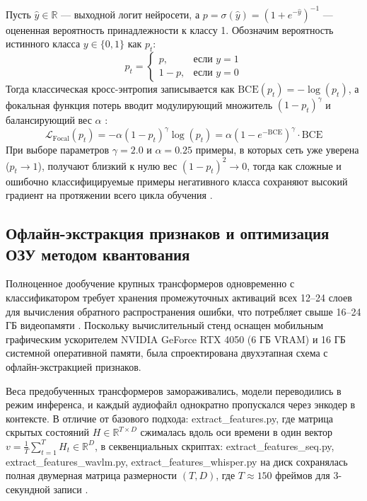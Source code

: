 \documentclass[a4paper,14pt]{extarticle}
\begin{document}
	Пусть $\hat{y} \in \mathbb{R}$ — выходной логит нейросети, а $p = \sigma(\hat{y}) = (1 + e^{-\hat{y}})^{-1}$ — оцененная вероятность принадлежности к классу 1. Обозначим вероятность истинного класса $y \in \{0, 1\}$ как $p_t$:
	\begin{equation}
		p_t = \begin{cases} p, & \text{если } y = 1 \\ 1 - p, & \text{если } y = 0 \end{cases}
	\end{equation}
	Тогда классическая кросс-энтропия записывается как $\text{BCE}(p_t) = -\log(p_t)$, а фокальная функция потерь вводит модулирующий множитель $(1 - p_t)^\gamma$ и балансирующий вес $\alpha$ \cite{focalloss}:
	\begin{equation}
		\mathcal{L}_{\text{Focal}}(p_t) = -\alpha (1 - p_t)^\gamma \log(p_t) = \alpha \left(1 - e^{-\text{BCE}}\right)^\gamma \cdot \text{BCE}
	\end{equation}
	При выборе параметров $\gamma = 2.0$ и $\alpha = 0.25$ примеры, в которых сеть уже уверена ($p_t \to 1$), получают близкий к нулю вес $(1 - p_t)^2 \to 0$, тогда как сложные и ошибочно классифицируемые примеры негативного класса сохраняют высокий градиент на протяжении всего цикла обучения \cite{focalloss}.
	
	\subsection{Офлайн-экстракция признаков и оптимизация ОЗУ методом квантования}
	Полноценное дообучение крупных трансформеров одновременно с классификатором требует хранения промежуточных активаций всех 12–24 слоев для вычисления обратного распространения ошибки, что потребляет свыше 16–24 ГБ видеопамяти \cite{wav2vec, wavlm}. Поскольку вычислительный стенд оснащен мобильным графическим ускорителем NVIDIA GeForce RTX 4050 (6 ГБ VRAM) и 16 ГБ системной оперативной памяти, была спроектирована двухэтапная схема с офлайн-экстракцией признаков.
	
	Веса предобученных трансформеров замораживались, модели переводились в режим инференса, и каждый аудиофайл однократно пропускался через энкодер в контексте. В отличие от базового подхода: extract\_\allowbreak features.py, где матрица скрытых состояний $H \in \mathbb{R}^{T \times D}$ сжималась вдоль оси времени в один вектор $v = \frac{1}{T}\sum_{t=1}^T H_t \in \mathbb{R}^D$, в секвенциальных скриптах: extract\_\allowbreak features\_\allowbreak seq.py, extract\_\allowbreak features\_\allowbreak wavlm.py, extract\_\allowbreak features\_\allowbreak whisper.py на диск сохранялась полная двумерная матрица размерности $(T, D)$, где $T \approx 150$ фреймов для 3-секундной записи \cite{wav2vec, wavlm, whisper}.
	
\end{document}
